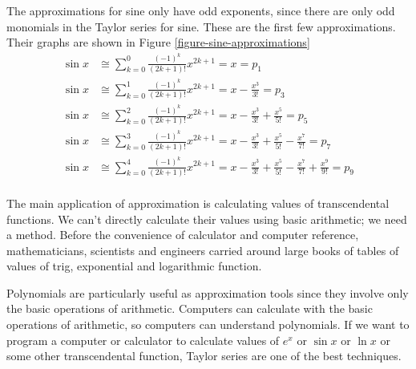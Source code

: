 \documentclass[fleqn]{report}
\begin{document}
\begin{example}
The approximations for sine only have odd exponents, since there
are only odd monomials in the Taylor series for sine. These
are the first few approximations. Their graphs are shown in
Figure \ref{figure-sine-approximations}
\begin{align*}
\sin x & \cong \sum_{k=0}^0 \frac{(-1)^k}{(2k+1)!} x^{2k+1} =
x = p_1 \\
\sin x & \cong \sum_{k=0}^1 \frac{(-1)^k}{(2k+1)!} x^{2k+1} =
x - \frac{x^3}{3!} = p_3 \\
\sin x & \cong \sum_{k=0}^2 \frac{(-1)^k}{(2k+1)!} x^{2k+1} =
x - \frac{x^3}{3!} + \frac{x^5}{5!} = p_5 \\
\sin x & \cong \sum_{k=0}^3 \frac{(-1)^k}{(2k+1)!} x^{2k+1} =
x - \frac{x^3}{3!} + \frac{x^5}{5!} - \frac{x^7}{7!} = p_7 \\
\sin x & \cong \sum_{k=0}^4 \frac{(-1)^k}{(2k+1)!} x^{2k+1} =
x - \frac{x^3}{3!} + \frac{x^5}{5!} - \frac{x^7}{7!} +
\frac{x^9}{9!} = p_9 \\
\end{align*}
\end{example}

The main application of approximation is calculating values
of transcendental functions. We can't directly calculate their
values using basic arithmetic; we need a method. Before the
convenience of calculator and computer reference,
mathematicians, scientists and engineers carried around large
books of tables of values of trig, exponential and
logarithmic function. 

Polynomials are particularly useful as approximation tools
since they involve only the basic operations of arithmetic.
Computers can calculate with the basic operations of
arithmetic, so computers can understand polynomials. If we
want to program a computer or calculator to calculate values
of $e^x$ or $\sin x$ or $\ln x$ or some other transcendental
function, Taylor series are one of the best techniques. 
\end{document}
